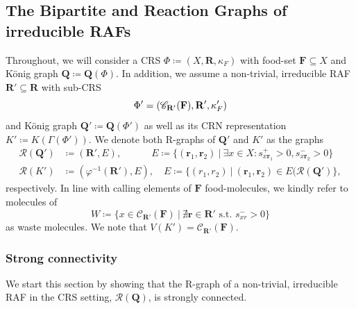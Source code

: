 \documentclass[pdflatex]{sn-jnl}
\theoremstyle{thmstyleone}%
\theoremstyle{examplesty}%
\theoremstyle{thmstylethree}%
\newcommand{\king}{K}
\newcommand{\queen}{\mathbf{Q}}
\newcommand{\food}{\ensuremath{\mathbf{F}}}
\newcommand{\closure}[2]{\mathscr{C}_{#1}(#2)}
\newcommand{\FR}[0]{\mathbf{R}}
\newcommand{\RGraph}[0]{\mathcal{R}}
\newcommand{\fr}[0]{\mathbf{r}}
\newcommand{\RAF}[0]{\mathbf{R}'}
\newcommand{\cat}{\kappa_F}
\begin{document}
\subsection{The Bipartite and Reaction Graphs of irreducible RAFs}

Throughout, we will consider a CRS $\Phi\coloneqq (X,\FR,\cat)$ with
food-set $\food\subseteq X$ and K\"onig graph $\queen\coloneqq
\queen(\Phi)$. In addition, we assume a non-trivial, irreducible RAF
$\RAF\subseteq \FR$ with sub-CRS
\begin{equation}
  \Phi'= (\closure{\RAF}{\food}, \RAF, \cat')\\
\end{equation}
and K\"onig graph $\queen'\coloneqq \queen(\Phi')$ as well as its CRN
representation $\king'\coloneqq \king(\Gamma(\Phi'))$. We denote both
R-graphs of $\queen'$ and $\king'$ as the graphs
\begin{equation}
  \begin{split}
    \RGraph(\queen')&\coloneqq (\RAF, E), \hspace{25pt} \quad E\coloneqq \{(\fr_1,\fr_2) \ \vert \ \exists x\in X: s^+_{x\fr_1}>0, s^-_{x\fr_2}>0\} \\
    \RGraph(\king') &\coloneqq (\varphi^{-1}(\RAF), E), \quad E\coloneqq \{(r_1,r_2) \ \vert \ (\fr_1,\fr_2)\in E(\RGraph(\queen')\},
  \end{split}
\end{equation}
respectively. In line with calling elements of $\food$ food-molecules, we kindly refer to molecules of
\begin{equation}\label{eq:Waste}
  W\coloneqq \{x\in \closure{\RAF}{\food} \ | \ \nexists \fr \in \RAF \text{ s.t. } s^-_{xr}>0\}		
\end{equation}
as waste molecules. We note that $V(\king')=\closure{\RAF}{\food}$.

\subsubsection{Strong connectivity}

We start this section by showing that the R-graph of a non-trivial,
irreducible RAF in the CRS setting, $\RGraph(\queen)$, is strongly
connected.
\end{document}
